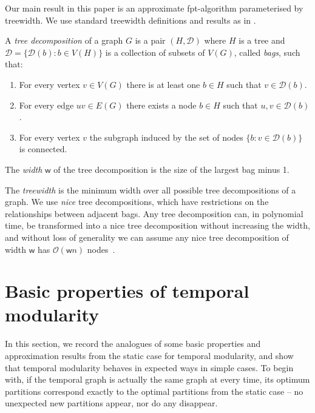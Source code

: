 \documentclass[runningheads]{llncs}
\newcommand{\w}{\mathsf{w}}
\begin{document}
Our main result in this paper is an approximate fpt-algorithm  parameterised by treewidth. We use standard treewidth definitions and results as in \cite{cygan2015Algorithms}.
\begin{definition} \label{def:tree_decomp} \cite{cygan2015Algorithms}
    A \emph{tree decomposition} of a graph $G$ is a pair $(H,\mathcal{D})$ where $H$ is a tree and $\mathcal{D}=\{\mathcal{D}(b):b\in V(H)\}$ is a collection of subsets of $V(G)$, called \emph{bags}, such that:
\begin{enumerate}
    \item For every vertex $v \in V(G)$ there is at least one $b \in H$ such that $v \in \mathcal{D}(b)$.
    \item For every edge $uv \in E(G)$ there exists a node $b \in H$ such that $u,v \in \mathcal{D}(b)$.
    \item For every vertex $v$ the subgraph induced by the set of nodes $\{b: v \in \mathcal{D}(b)\}$ is connected.
\end{enumerate}
The \emph{width} $\w$ of the tree decomposition is the size of the largest bag minus 1.
\end{definition}
 The \emph{treewidth} is the minimum width over all possible tree decompositions of a graph. We use \emph{nice} tree decompositions, which have restrictions on the relationships between adjacent bags. Any tree decomposition can, in polynomial time, be transformed into a nice tree decomposition without increasing the width, and without loss of generality we can assume any nice tree decomposition of width $\w$ has $\mathcal{O}(\w n)$ nodes~\cite{cygan2015Algorithms}.


    \section{Basic properties of temporal modularity}\label{sec:basic_facts}

In this section, we record the analogues of some basic properties and approximation results from the static case for temporal modularity, and show that temporal modularity behaves in expected ways in simple cases. To begin with, if the temporal graph is actually the same graph at every time, its optimum partitions correspond exactly to the optimal partitions from the static case -- no unexpected new partitions appear, nor do any disappear.
\end{document}
